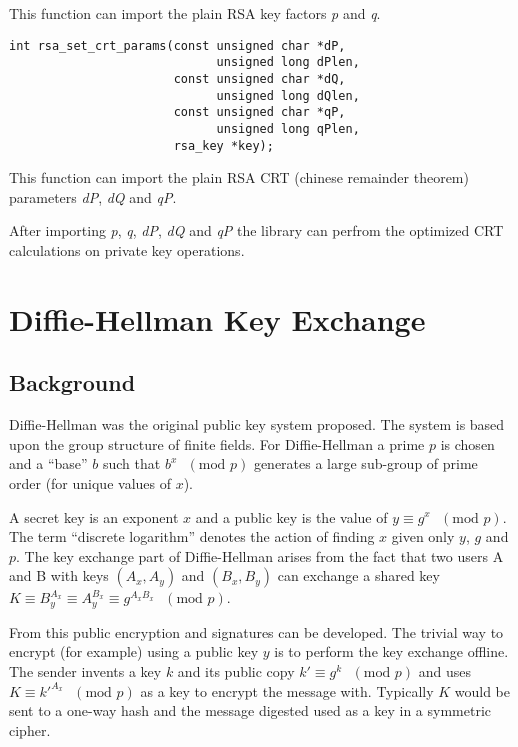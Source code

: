 \documentclass[synpaper]{book}
\newcommand{\mysection}[1]    %
	{                   %
	\section{#1}
   \markboth{\textsf{www.libtom.net}}{\thesection ~ {#1}}
	}
\begin{document}
This function can import the plain RSA key factors \textit{p} and \textit{q}.

\begin{verbatim}
int rsa_set_crt_params(const unsigned char *dP,
                             unsigned long dPlen,
                       const unsigned char *dQ,
                             unsigned long dQlen,
                       const unsigned char *qP,
                             unsigned long qPlen,
                       rsa_key *key);
\end{verbatim}

This function can import the plain RSA CRT (chinese remainder theorem) parameters \textit{dP}, \textit{dQ} and \textit{qP}.

After importing \textit{p}, \textit{q}, \textit{dP}, \textit{dQ} and \textit{qP}
the library can perfrom the optimized CRT calculations on private key operations.

\chapter{Diffie-Hellman Key Exchange}

\mysection{Background}

Diffie-Hellman was the original public key system proposed.  The system is based upon the group structure
of finite fields.  For Diffie-Hellman a prime $p$ is chosen and a ``base'' $b$ such that $b^x\mbox{ }(\mbox{mod }p)$
generates a large sub-group of prime order (for unique values of $x$).

A secret key is an exponent $x$ and a public key is the value of $y \equiv g^x\mbox{ }(\mbox{mod }p)$.  The term
``discrete logarithm'' denotes the action of finding $x$ given only $y$, $g$ and $p$.  The key exchange part of
Diffie-Hellman arises from the fact that two users A and B with keys $(A_x, A_y)$ and $(B_x, B_y)$ can exchange
a shared key $K \equiv B_y^{A_x} \equiv A_y^{B_x} \equiv g^{A_xB_x}\mbox{ }(\mbox{mod }p)$.

From this public encryption and signatures can be developed.  The trivial way to encrypt (for example) using a public key
$y$ is to perform the key exchange offline.  The sender invents a key $k$ and its public copy
$k' \equiv g^k\mbox{ }(\mbox{mod }p)$ and uses $K \equiv k'^{A_x}\mbox{ }(\mbox{mod }p)$ as a key to encrypt
the message with.  Typically $K$ would be sent to a one-way hash and the message digested used as a key in a
symmetric cipher.
\end{document}
